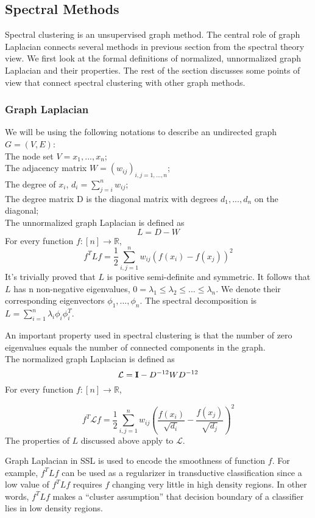 \subsection{Spectral Methods}\label{sec:spec}
Spectral clustering is an unsupervised graph method. The central role of graph
Laplacian connects several methods in previous section from the spectral theory
view. We first look at the formal definitions of normalized, unnormalized graph
Laplacian and their properties. The rest of the section discusses some points of
view that connect spectral clustering with other graph methods.

\subsubsection*{Graph Laplacian}\label{sec:specdef}


We will be using the following notations to describe an undirected graph $G = (V, E)$:\\
The node set $V = {x_1, ..., x_n}$;\\
The adjacency matrix $W = (w_{ij} ) _{i,j = 1, ..., n} $;\\
The degree of $x_i$, $d_i = \sum_{j=i}^{n}w_{ij}$;\\
The degree matrix D is the diagonal matrix with degrees $d_1, ..., d_n$ on the diagonal;\\

The unnormalized graph Laplacian is defined as \[L=D-W\] For every function $f: [n]\rightarrow \mathbb{R}  $,
\begin{equation} 
f^T L f = \frac{1}{2} \sum_{i,j=1}^{n}w_{ij}(f(x_i)-f(x_j))^2
\end{equation}
It's trivially proved that $L$ is positive semi-definite and symmetric. 
It follows that $L$ has n non-negative eigenvalues, $0 = \lambda_1\leq \lambda_2 \leq ... \leq \lambda_n$. We denote their corresponding eigenvectors $\phi_1, ..., \phi_n$. The spectral decomposition is $L = \sum_{i=1}^n \lambda_i\phi_i\phi_i^T$.

An important property used in spectral clustering is that the number of zero eigenvalues equals the number of connected components in the graph.\\

The normalized graph Laplacian is defined as \[ \mathcal{L} = \mathbf{I} - D^{-1\/2}W D^{-1\/2}\]
For every function  $f: [n]\rightarrow \mathbb{R}  $,

\begin{equation} 
f^T \mathcal{L} f = \frac{1}{2} \sum_{i,j=1}^{n}w_{ij}(\frac{f(x_i)}{\sqrt{d_i}}-\frac{f(x_j)}{\sqrt{d_j}})^2
\end{equation}
The properties of $L$ discussed above apply to $ \mathcal{L}$.
\par
Graph Laplacian in SSL is used to encode the smoothness of function $f$.   For
example, $f^T L f$ can be used as a regularizer in transductive classification
since a low value of  $f^T L f$ requires $f$ changing very little in high
density regions.  In other words, $f^T L f$ makes a ``cluster assumption'' that
decision boundary of a classifier lies in low density regions.

